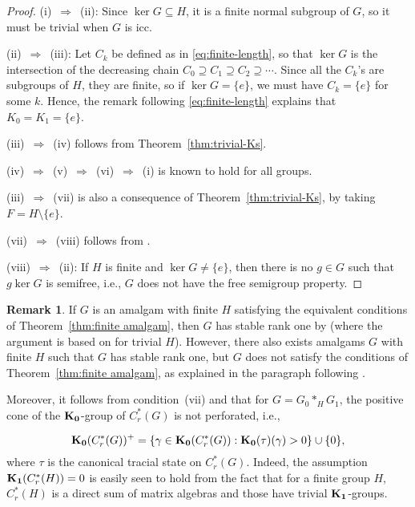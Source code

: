 \documentclass[a4paper]{amsart}
\theoremstyle{plain}
\theoremstyle{definition}
\newtheorem{remark}[theorem]{Remark}
\theoremstyle{remark}
\numberwithin{theorem}{section}
\begin{document}
\begin{proof}
(i)~$\Longrightarrow$~(ii):
Since $\ker G\subseteq H$, it is a finite normal subgroup of $G$, so it must be trivial when $G$ is icc.

(ii)~$\Longrightarrow$~(iii):
Let $C_k$ be defined as in \eqref{eq:finite-length},
so that $\ker G$ is the intersection of the decreasing chain $C_0\supseteq C_1\supseteq C_2\supseteq \dotsb$.
Since all the $C_k$'s are subgroups of $H$, they are finite, so if $\ker G=\{e\}$,
we must have $C_k=\{e\}$ for some $k$.
Hence, the remark following \eqref{eq:finite-length} explains that $K_0=K_1=\{e\}$.

(iii)~$\Longrightarrow$~(iv) follows from Theorem~\ref{thm:trivial-Ks}.

(iv)~$\Longrightarrow$~(v)~$\Longrightarrow$~(vi)~$\Longrightarrow$~(i) is known to hold for all groups.

(iii)~$\Longrightarrow$~(vii) is also a consequence of Theorem~\ref{thm:trivial-Ks}, by taking $F=H\setminus\{e\}$.

(vii)~$\Longrightarrow$~(viii) follows from \cite[Proposition~5.1]{DH}.

(viii)~$\Longrightarrow$~(ii):
If $H$ is finite and $\ker G\neq\{e\}$,
then there is no $g\in G$ such that $g\ker G$ is semifree, i.e., $G$ does not have the free semigroup property.
\end{proof}

\begin{remark}
If $G$ is an amalgam with finite $H$ satisfying the equivalent conditions of Theorem~\ref{thm:finite amalgam},
then $G$ has stable rank one by \cite[Theorem~1.6]{DH}
(where the argument is based on \cite[Corollary~3.9]{DHR} for trivial $H$).
However, there also exists amalgams $G$ with finite $H$ such that $G$ has stable rank one,
but $G$ does not satisfy the conditions of Theorem~\ref{thm:finite amalgam},
as explained in the paragraph following \cite[Theorem~1.6]{DH}.

Moreover, it follows from condition~(vii) and \cite[Corollary~3.6]{Ivanov} that for $G = G_0 *_H G_1$,
the positive cone of the ${\bf K_0}$-group of $C^*_r(G)$ is not perforated, i.e.,

\[
{\bf K_0}(C^*_r(G))^+ = \{ \gamma \in {\bf K_0}(C^*_r(G)) : {\bf K_0}(\tau)(\gamma) > 0 \} \cup \{ 0 \},
\]
where $\tau$ is the canonical tracial state on $C^*_r(G)$.
Indeed, the assumption ${\bf K_1}(C^*_r(H))=0$ is easily seen to hold from the fact that for a finite group $H$,
$C^*_r(H)$ is a direct sum of matrix algebras and those have trivial ${\bf K_1}$-groups.
\end{remark}
\end{document}
